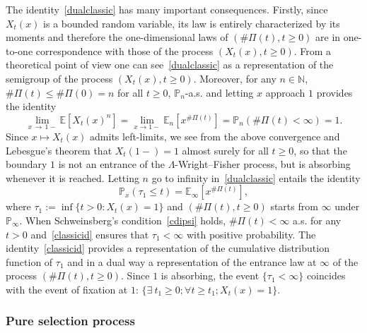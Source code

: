 \documentclass[10pt]{amsart}
\theoremstyle{definition}\newtheorem{defi}[theo]{Definition}\newtheorem{rema}[theo]{Remark}\newtheorem{exam}[theo]{Example}\newtheorem{exem}[theo]{Example}\newtheorem{nota}[theo]{Notation}
\newcommand{\bbN}{\mathbb{N}}
\newcommand{\bbE}{\mathbb{E}}
\newcommand{\bbP}{\mathbb{P}}
\let\oldexists\exists
\renewcommand*{\exists}{\mathrel{\oldexists}}
\let\oldforall\forall
\renewcommand*{\forall}{\mathrel{\oldforall}}
\begin{document}
The identity~\eqref{dualclassic} has many important consequences. Firstly, since $X_t(x)$ is a bounded random variable, its law is entirely characterized by its moments and therefore the one-dimensional laws of $(\#\Pi(t),t\geq 0)$ are in one-to-one correspondence with those of the process $(X_t(x),t\geq 0)$. From a theoretical point of view one can see~\eqref{dualclassic} as a representation of the semigroup of the process $(X_t(x),t\geq 0)$. Moreover, for any $n\in \bbN$, $\#\Pi(t)\leq \#\Pi(0)=n$ for all $t\geq 0$, $\bbP_n$-a.s. and letting $x$ approach $1$ provides the identity
\[
\underset{x\,\rightarrow\,1-}{\lim}\bbE\left[X_t(x)^n\right]=\underset{x\rightarrow 1-}{\lim}\bbE_n\left[x^{\#\Pi(t)}\right]=\bbP_n(\#\Pi(t)<\infty)=1.
\]
Since $x\mapsto X_t(x)$ admits left-limits, we see from the above convergence and Lebesgue's theorem that $X_t(1-)=1$ almost surely for all $t\geq 0$, so that the boundary $1$ is not an entrance of the $\Lambda$-Wright--Fisher process, but is absorbing whenever it is reached. Letting $n$ go to infinity in~\eqref{dualclassic} entails the identity
\begin{equation}\label{classicid}
\bbP_x(\tau_1\leq t)=\bbE_{\infty}\left[x^{\#\Pi(t)}\right],
\end{equation}
where $\tau_1:=\inf\{t>0: X_t(x)=1\}$ and $(\#\Pi(t),t\geq 0)$ starts from $\infty$ under $\bbP_\infty$. When Schweinsberg's condition~\eqref{cdipsi} holds, $\#\Pi(t)<\infty$ a.s. for any $t>0$ and~\eqref{classicid} ensures that $\tau_1<\infty$ with positive probability. The identity~\eqref{classicid} provides a representation of the cumulative distribution function of $\tau_1$ and in a dual way a representation of the entrance law at $\infty$ of the process $(\#\Pi(t),t\geq 0)$. Since $1$ is absorbing, the event $\{\tau_1<\infty\}$ coincides with the event of fixation at $1$: $\{\exists \ t_1\geq 0; \forall t\geq t_1; X_t(x)=1\}$.


\subsubsection{Pure selection process}
\end{document}
